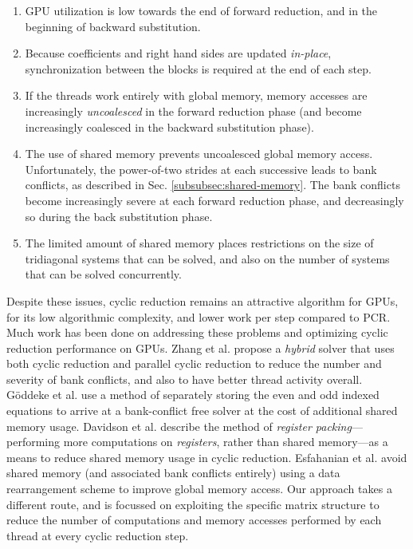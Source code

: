 \begin{enumerate}
\item GPU utilization is low towards the end of forward reduction,
    and in the beginning of backward substitution.

\item Because coefficients and right hand sides
    are updated \emph{in-place},
    synchronization between the blocks is required at
    the end of each step.

\item If the threads work entirely with global memory,
    memory accesses are increasingly
    \emph{uncoalesced} in the forward reduction phase
    (and become increasingly coalesced in the
    backward substitution phase).

\item The use of shared memory prevents
    uncoalesced global memory access.
    Unfortunately,
    the power-of-two strides at each successive
    leads to bank conflicts,
    as described in Sec. \ref{subsubsec:shared-memory}.
    The bank conflicts become increasingly severe
    at each forward reduction phase,
    and decreasingly so during the back substitution phase.
    
\item The limited amount of shared memory places restrictions
    on the size of tridiagonal systems that can be solved,
    and also on the number of systems that can be solved
    concurrently.
\end{enumerate}

Despite these issues,
cyclic reduction remains an attractive algorithm
for GPUs,
for its low algorithmic complexity,
and lower work per step compared to PCR.
Much work has been done on
addressing these problems and
optimizing cyclic reduction performance on GPUs.
Zhang et al. \cite{Zhang2010FTS} propose a
\emph{hybrid} solver
that uses both cyclic reduction and parallel cyclic reduction
to reduce the number and severity of bank conflicts,
and also to have better thread activity overall.
G{\"o}ddeke et al. \cite{GoSt11CR}
use a method of separately storing
the even and odd indexed equations
to arrive at a bank-conflict free solver
at the cost of additional shared memory usage.
Davidson et al. \cite{davidson2011register}
describe the method of
\emph{register packing}---performing more computations
on \emph{registers}, rather than shared memory---as
a means to reduce shared memory usage in cyclic reduction.
Esfahanian et al. \cite{esfahanian2014efficient}
avoid shared memory (and associated bank conflicts entirely)
using a data rearrangement scheme to improve global memory access.
Our approach takes a different route,
and is focussed on exploiting the specific matrix structure
to reduce the number of computations and memory accesses
performed by each thread
at every cyclic reduction step.
